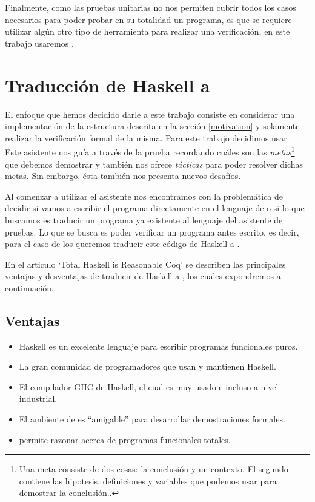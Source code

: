 Finalmente, como las pruebas unitarias no nos permiten cubrir todos los casos necesarios para poder probar en su totalidad un programa, es que se requiere utilizar algún otro tipo de herramienta para realizar una verificaci\'on, en este trabajo usaremos {\coq}.



\section{Traducción de Haskell a {\coq}}
El enfoque que hemos decidido darle a este trabajo consiste en considerar una implementaci\'on de 
la estructura descrita en la secci\'on \ref{motivation} y solamente realizar la verificaci\'on formal de la 
misma. Para este trabajo decidimos usar {\coq}. Este asistente nos gu\'ia a través de 
la prueba recordando cu\'ales son las \textit{metas}\footnote{Una meta consiste de dos cosas: la 
conclusi\'on y un contexto. El segundo contiene las hipotesis, definiciones y variables que podemos 
usar para demostrar la conclusi\'on.\cite{GOALS}.} que debemos demostrar y tambi\'en nos ofrece 
\textit{t\'acticas} para poder resolver dichas metas. Sin embargo, \'esta tambi\'en nos presenta 
nuevos desaf\'ios.

Al comenzar a utilizar el asistente nos encontramos con la problem\'atica de decidir si vamos a 
escribir el programa directamente en el lenguaje de {\coq} o si lo que buscamos es traducir un 
programa ya existente al lenguaje del asistente de pruebas. Lo que se busca es poder verificar un 
programa antes escrito, es decir, para el caso de los {\arns} queremos traducir este código de 
Haskell a {\coq}.

En el articulo `Total Haskell is Reasonable Coq' \cite{thrc} se describen las principales ventajas
y desventajas de traducir de Haskell a {\coq}, los cuales expondremos a continuaci\'on.

\subsection{Ventajas}
\begin{itemize}
    \item Haskell es un excelente lenguaje para escribir programas funcionales puros.
    \item La gran comunidad de programadores que usan y mantienen Haskell.
    \item El compilador GHC de Haskell, el cual es muy usado e incluso a nivel industrial.
    \item El ambiente de {\coq} es ``amigable'' para desarrollar demostraciones formales.
    \item {\coq} permite razonar acerca de programas funcionales totales.
\end{itemize}

